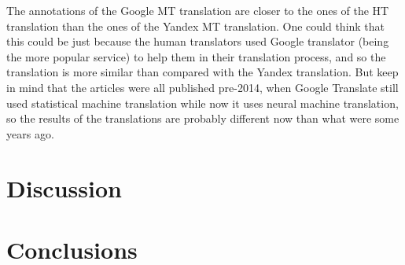 \begin{table}[h]
\centering
{}
\caption{Macro-Evaluation of how close the annotations of MT and MT+PE translation are to the annotations of HT}
\label{table:results_comparasion_translations_macro}
\end{table}

The annotations of the Google MT translation are closer to the ones of the HT translation than the ones of the Yandex MT translation. One could think that this could be just because the human translators used Google translator (being the more popular service) to help them in their translation process, and so the translation is more similar than compared with the Yandex translation. But keep in mind that the articles were all published pre-2014, when Google Translate still used statistical machine translation while now it uses neural machine translation, so the results of the translations are probably different now than what were some years ago. 



\section{Discussion}





\section{Conclusions}




  
